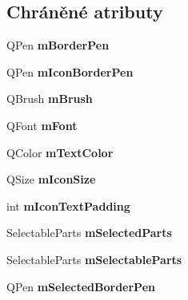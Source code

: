 \subsection*{Chráněné atributy}
\begin{DoxyCompactItemize}
\item 
\hypertarget{classQCPLegend_a52ab8342a382456131d567f962d7f9d0}{}Q\+Pen {\bfseries m\+Border\+Pen}\label{classQCPLegend_a52ab8342a382456131d567f962d7f9d0}

\item 
\hypertarget{classQCPLegend_a773ae518c3149fcabff4a2906fdacbc4}{}Q\+Pen {\bfseries m\+Icon\+Border\+Pen}\label{classQCPLegend_a773ae518c3149fcabff4a2906fdacbc4}

\item 
\hypertarget{classQCPLegend_a9bd7cd05a9a485e06eda513a348baf80}{}Q\+Brush {\bfseries m\+Brush}\label{classQCPLegend_a9bd7cd05a9a485e06eda513a348baf80}

\item 
\hypertarget{classQCPLegend_a56ffacb184a99eefe09a0c7181d0713d}{}Q\+Font {\bfseries m\+Font}\label{classQCPLegend_a56ffacb184a99eefe09a0c7181d0713d}

\item 
\hypertarget{classQCPLegend_a478b2d809a7390e9ff8f8bb70d6bd9fe}{}Q\+Color {\bfseries m\+Text\+Color}\label{classQCPLegend_a478b2d809a7390e9ff8f8bb70d6bd9fe}

\item 
\hypertarget{classQCPLegend_a39b972aae6c6a3fa5aa73313ab7a5765}{}Q\+Size {\bfseries m\+Icon\+Size}\label{classQCPLegend_a39b972aae6c6a3fa5aa73313ab7a5765}

\item 
\hypertarget{classQCPLegend_a8abf8843864ee9afc3f54f906c062240}{}int {\bfseries m\+Icon\+Text\+Padding}\label{classQCPLegend_a8abf8843864ee9afc3f54f906c062240}

\item 
\hypertarget{classQCPLegend_a917a34dd2856baafd8d56852d94d00e2}{}Selectable\+Parts {\bfseries m\+Selected\+Parts}\label{classQCPLegend_a917a34dd2856baafd8d56852d94d00e2}

\item 
\hypertarget{classQCPLegend_a179b4d5c1bea723b76e402ff48f0d7fb}{}Selectable\+Parts {\bfseries m\+Selectable\+Parts}\label{classQCPLegend_a179b4d5c1bea723b76e402ff48f0d7fb}

\item 
\hypertarget{classQCPLegend_a62906c996906ae23e9f724b6ac1f7334}{}Q\+Pen {\bfseries m\+Selected\+Border\+Pen}\label{classQCPLegend_a62906c996906ae23e9f724b6ac1f7334}


\end{DoxyCompactItemize}
